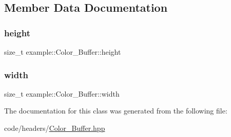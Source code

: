 \subsection{Member Data Documentation}
\mbox{\label{classexample_1_1_color___buffer_ae01f4538ee30af1d3072a425c5ad37ac}} 
\subsubsection{\texorpdfstring{height}{height}}
{\footnotesize\ttfamily size\+\_\+t example\+::\+Color\+\_\+\+Buffer\+::height\hspace{0.3cm}{\ttfamily [protected]}}

\mbox{\label{classexample_1_1_color___buffer_ab61454d4b35cbba00d2e634d14ed20ac}} 
\subsubsection{\texorpdfstring{width}{width}}
{\footnotesize\ttfamily size\+\_\+t example\+::\+Color\+\_\+\+Buffer\+::width\hspace{0.3cm}{\ttfamily [protected]}}



The documentation for this class was generated from the following file\+:\begin{DoxyCompactItemize}
\item 
code/headers/\mbox{\hyperlink{_color___buffer_8hpp}{Color\+\_\+\+Buffer.\+hpp}}\end{DoxyCompactItemize}
